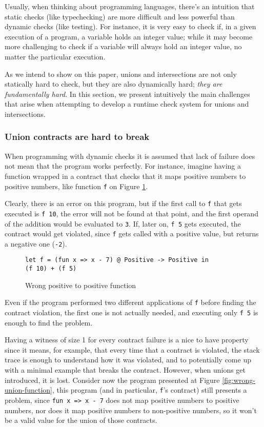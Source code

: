 \documentclass[sigplan,10pt,review,anonymous]{acmart}
\newcommand{\nickel}[1]{\lstinline[language=nickel]{#1}}
\begin{document}
Usually, when thinking about programming languages, there's an intuition
that static checks (like typechecking) are more difficult and less powerful
than dynamic checks (like testing).
For instance, it is very easy to check if,
in a given execution of a program, a variable holds an integer value; while it
may become more challenging to check if a variable will always hold an integer value,
no matter the particular execution.

As we intend to show on this paper, unions and intersections are not only
statically hard to check, but they are also dynamically hard;
\emph{they are fundamentally hard}.
In this section, we present intuitively the main challenges that arise
when attempting to develop a runtime check system for unions and intersections.

\subsubsection*{Union contracts are hard to break}

When programming with dynamic checks it is assumed that lack of
failure does not mean that the program works perfectly.
For instance, imagine having a function wrapped in a contract
that checks that it maps positive numbers to positive numbers, like
function \nickel{f} on Figure \ref{fig:pos-to-pos}.

Clearly, there is an error on this program, but if the first call
to \nickel{f} that gets executed is \nickel{f 10}, the error will not
be found at that point, and the first operand of the addition would be
evaluated to \nickel{3}.
If, later on, \nickel{f 5} gets executed, the contract would get violated,
since \nickel{f} gets called with a positive value, but returns a negative
one (\nickel{-2}).

\begin{figure}[h]
\begin{lstlisting}[language=nickel]
let f = (fun x => x - 7) @ Positive -> Positive in
(f 10) + (f 5) 
\end{lstlisting}
\caption{Wrong positive to positive function}
\label{fig:pos-to-pos}
\end{figure}

Even if the program performed two different applications of \nickel{f}
before finding the contract violation, the first one is not actually
needed, and executing only \nickel{f 5} is enough to find the problem.

Having a witness of size 1 for every contract failure is a nice to have property
since it means, for example, that every time that a contract is violated,
the stack trace is enough to understand how it was violated, and to potentially
come up with a minimal example that breaks the contract.
However, when unions get introduced, it is lost.
Consider now the program presented at Figure \ref{fig:wrong-union-function},
this program (and in particular, \nickel{f}'s contract) still presents a problem,
since \nickel{fun x => x - 7} does not map positive numbers to positive numbers,
nor does it map positive numbers to non-positive numbers, so it won't be a valid
value for the union of those contracts.
\end{document}
